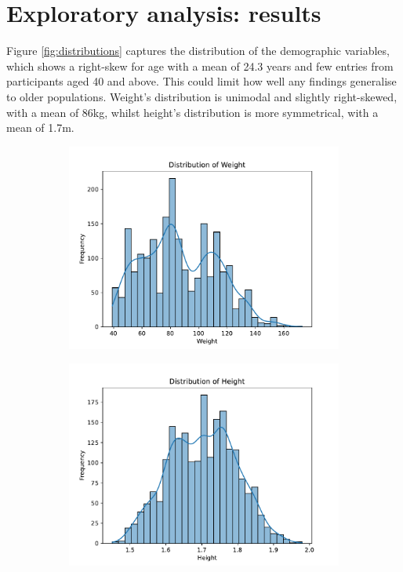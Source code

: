\section{Exploratory analysis: results}

Figure \ref{fig:distributions} captures the distribution of the demographic variables, which shows a right-skew for age with a mean of 24.3 years and few entries from participants aged 40 and above. This could limit how well any findings generalise to older populations. Weight's distribution is unimodal and slightly right-skewed, with a mean of 86kg, whilst height's distribution is more symmetrical, with a mean of 1.7m.

\begin{figure}
  \centering
  \begin{subfigure}[b]{0.7\textwidth}
    \centering
    \includegraphics[width=\textwidth]{weight_dist.pdf}
    \label{fig:weight}
  \end{subfigure}
  \hfill
  \begin{subfigure}[b]{0.7\textwidth}
    \centering
    \includegraphics[width=\textwidth]{height_dist.pdf}

\end{subfigure}
\end{figure}
